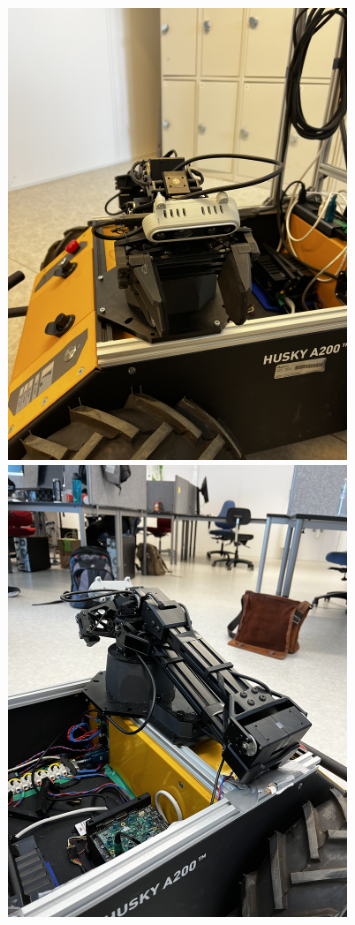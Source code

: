 \begin{figure}[ht]
  \centering
  \begin{minipage}[b]{0.49\textwidth}
        \centering
        \includegraphics[angle=-90,width = 0.8\textwidth]{Figures/figVX300PhysComplete1.jpg}
  \end{minipage}
  \hfill
  \begin{minipage}[b]{0.49\textwidth}
    \centering
    \includegraphics[angle=-90,width = 0.8\textwidth]{Figures/figVX300PhysComplete5.jpg}

\end{minipage}
\end{figure}
